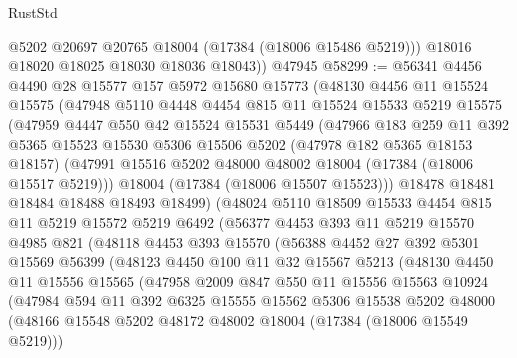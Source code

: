 \begin{lexlean}{RustStd}
\begin{coremodule}
          @5202
          @20697
          @20765
          @18004
          (@17384 (@18006 @15486 @5219)))
        @18016
        @18020
        @18025
        @18030
        @18036
        @18043))
    @47945
@58299 := @56341
    @4456
    @4490
    @28
    @15577
    @157
    @5972
    @15680
    @15773
    (@48130
      @4456
      @11
      @15524
      @15575
      (@47948
        @5110
        @4448
        @4454
        @815
        @11
        @15524
        @15533
        @5219
        @15575
        (@47959
          @4447
          @550
          @42
          @15524
          @15531
          @5449
          (@47966
            @183
            @259
            @11
            @392
            @5365
            @15523
            @15530
            @5306
            @15506
            @5202
            (@47978 @182 @5365 @18153 @18157)
            (@47991 @15516 @5202 @48000 @48002 @18004 (@17384 (@18006 @15517 @5219)))
            @18004
            (@17384 (@18006 @15507 @15523)))
          @18478
          @18481
          @18484
          @18488
          @18493
          @18499)
        (@48024
          @5110
          @18509
          @15533
          @4454
          @815
          @11
          @5219
          @15572
          @5219
          @6492
          (@56377
            @4453
            @393
            @11
            @5219
            @15570
            @4985
            @821
            (@48118
              @4453
              @393
              @15570
              (@56388
                @4452
                @27
                @392
                @5301
                @15569
                @56399
                (@48123
                  @4450
                  @100
                  @11
                  @32
                  @15567
                  @5213
                  (@48130
                    @4450
                    @11
                    @15556
                    @15565
                    (@47958
                      @2009
                      @847
                      @550
                      @11
                      @15556
                      @15563
                      @10924
                      (@47984
                        @594
                        @11
                        @392
                        @6325
                        @15555
                        @15562
                        @5306
                        @15538
                        @5202
                        @48000
                        (@48166 @15548 @5202 @48172 @48002 @18004 (@17384 (@18006 @15549 @5219)))

\end{coremodule}
\end{lexlean}
